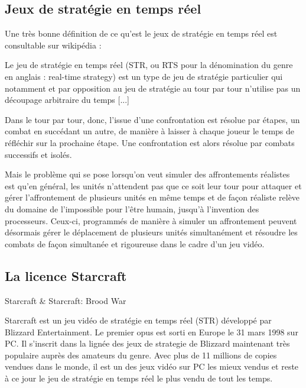 \subsection{Jeux de stratégie en temps réel}%
\label{sub:jeux_de_strategie_en_temps_reel}

Une très bonne définition de ce qu'est le jeux de stratégie en
temps réel est consultable sur wikipédia :

  Le jeu de stratégie en temps réel (STR, ou RTS pour la
  dénomination du genre en anglais : real-time strategy) est un type de
  jeu de stratégie particulier qui notamment et par opposition au jeu de
  stratégie au tour par tour n’utilise pas un découpage arbitraire du
  temps [...]

  Dans le tour par tour, donc, l’issue d’une confrontation est résolue par
  étapes, un combat en succédant un autre, de manière à laisser à chaque
  joueur le temps de réfléchir sur la prochaine étape. Une confrontation
  est alors résolue par combats successifs et isolés.

  Mais le problème qui se pose lorsqu’on veut simuler des affrontements
  réalistes est qu’en général, les unités n’attendent pas que ce soit leur
  tour pour attaquer et gérer l’affrontement de plusieurs unités en même
  temps et de façon réaliste relève du domaine de l’impossible pour l’être
  humain, jusqu’à l’invention des processeurs. Ceux-ci, programmés de
  manière à simuler un affrontement peuvent désormais gérer le déplacement
  de plusieurs unités simultanément et résoudre les combats de façon
  simultanée et rigoureuse dans le cadre d’un jeu vidéo.

\subsection{La licence Starcraft}%
\label{sub:la_licence_starcraft}

Starcraft & Starcraft: Brood War

  Starcraft est un jeu vidéo de stratégie en temps réel (STR) développé
  par Blizzard Entertainment. Le premier opus est sorti en Europe le 31
  mars 1998 sur PC. Il s'inscrit dans la lignée des jeux de strategie de
  Blizzard maintenant très populaire auprès des amateurs du genre. Avec
  plus de 11 millions de copies vendues dans le monde, il est un des
  jeux vidéo sur PC les mieux vendus et reste à ce jour le jeu de
  stratégie en temps réel le plus vendu de tout les temps.

